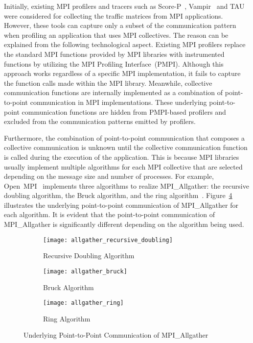 Initially, existing MPI profilers and tracers such as
\mbox{Score-P}~\autocite{Knupfer2012}, Vampir~\autocite{Knupfer2008} and
TAU~\autocite{Shende2006} were considered for collecting the traffic matrices
from MPI applications. However, these tools can capture only a subset of the
communication pattern when profiling an application that uses MPI collectives.
The reason can be explained from the following technological aspect. Existing
MPI profilers replace the standard MPI functions provided by MPI libraries
with instrumented functions by utilizing the MPI Profiling Interface~(PMPI).
Although this approach works regardless of a specific MPI implementation, it
fails to capture the function calls made within the MPI library. Meanwhile,
collective communication functions are internally implemented as a combination
of point-to-point communication in MPI implementations. These underlying
point-to-point communication functions are hidden from PMPI-based profilers
and excluded from the communication patterns emitted by profilers.

Furthermore, the combination of point-to-point communication that composes a
collective communication is unknown until the collective communication
function is called during the execution of the application. This is because
MPI libraries usually implement multiple algorithms for each MPI collective
that are selected depending on the message size and number of processes. For
example, Open~MPI~\cite{Gabriel2004} implements three algorithms to realize
MPI\_Allgather: the recursive doubling algorithm, the Bruck algorithm, and the
ring algorithm~\cite{Rabenseifner2004}. Figure~\ref{fig:allgather-algorithms}
illustrates the underlying point-to-point communication of MPI\_Allgather for
each algorithm. It is evident that the point-to-point communication of
MPI\_Allgather is significantly different depending on the algorithm being
used.

\begin{figure}
    \centering
    \begin{subfigure}{\linewidth}
        \centering
        \texttt{[image: allgather\_recursive\_doubling]}
        \caption{Recursive Doubling Algorithm}%
        \label{fig:allgather-recursive}
    \end{subfigure}
    \begin{subfigure}{\linewidth}
        \centering
        \texttt{[image: allgather\_bruck]}
        \caption{Bruck Algorithm}%
        \label{fig:allgather-bruck}
    \end{subfigure}
    \begin{subfigure}{\linewidth}
        \centering
        \texttt{[image: allgather\_ring]}
        \caption{Ring Algorithm}%
        \label{fig:allgather-ring}
    \end{subfigure}
    \caption{Underlying Point-to-Point Communication of MPI\_Allgather}%
    \label{fig:allgather-algorithms}
\end{figure}


